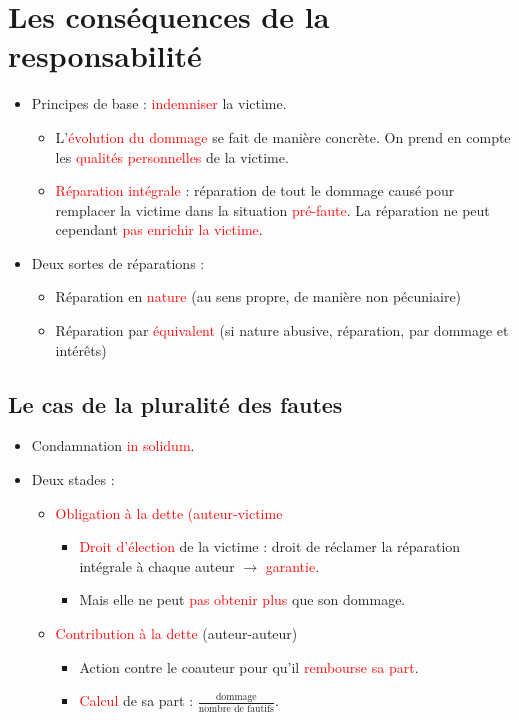 \section{Les conséquences de la responsabilité}
\begin{itemize}
	\item Principes de base : \textcolor{red}{indemniser} la victime.
	\begin{itemize}
		\item L'\textcolor{red}{évolution du dommage} se fait de manière concrète. On prend en compte les \textcolor{red}{qualités personnelles} de la victime.
		\item \textcolor{red}{Réparation intégrale} : réparation de tout le dommage causé pour remplacer la victime dans la situation \textcolor{red}{pré-faute}. La réparation ne peut cependant \textcolor{red}{pas enrichir la victime}.
	\end{itemize}
	\item Deux sortes de réparations :
	\begin{itemize}
		\item Réparation en \textcolor{red}{nature} (au sens propre, de manière non pécuniaire)
		\item Réparation par \textcolor{red}{équivalent} (si nature abusive, réparation, par dommage et intérêts)
	\end{itemize}
\end{itemize}

\subsection{Le cas de la pluralité des fautes}
\begin{itemize}
	\item Condamnation \textcolor{red}{in solidum}.
	\item Deux stades :
	\begin{itemize}
		\item \textcolor{red}{Obligation à la dette (auteur-victime}
		\begin{itemize}
			\item \textcolor{red}{Droit d'élection} de la victime : droit de réclamer la réparation intégrale à chaque auteur $\rightarrow$ \textcolor{red}{garantie}.
			\item Mais elle ne peut \textcolor{red}{pas obtenir plus} que son dommage.
		\end{itemize}
		\item \textcolor{red}{Contribution à la dette} (auteur-auteur)
		\begin{itemize}
			\item Action contre le coauteur pour qu'il \textcolor{red}{rembourse sa part}.
			\item \textcolor{red}{Calcul} de sa part : $\frac{\textrm{dommage}}{\textrm{nombre de fautifs}}$.
		\end{itemize}
	\end{itemize}
\end{itemize}

